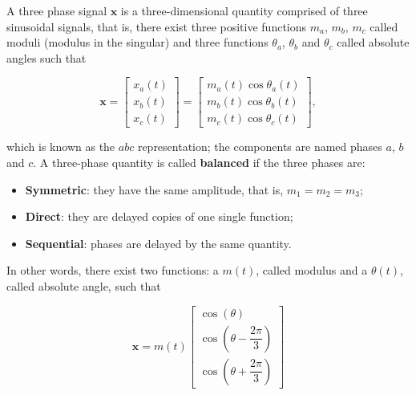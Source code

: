 \begin{definition}\label{def:three_phase_signal} %
	A three phase signal $\mathbf{x}$ is a three-dimensional quantity comprised of three sinusoidal signals, that is, there exist three positive functions $m_a$, $m_b$, $m_c$ called moduli (modulus in the singular) and three functions $\theta_a$, $\theta_b$ and $\theta_c$ called absolute angles such that

\begin{equation} \mathbf{x} = \left[\begin{array}{c} x_a\left(t\right)\\ x_b\left(t\right) \\ x_c\left(t\right) \end{array}\right] = \left[\begin{array}{c} m_a\left(t\right)\cos\theta_a(t)\\ m_b\left(t\right)\cos\theta_b(t) \\ m_c\left(t\right)\cos\theta_c(t) \end{array}\right], \end{equation}

	which is known as the $abc$ representation; the components are named phases $a$, $b$ and $c$. A three-phase quantity is called \textbf{balanced} if the three phases are:

\begin{itemize}
	\item \textbf{Symmetric}: they have the same amplitude, that is, $m_1 = m_2 = m_3$;
	\item \textbf{Direct}: they are delayed copies of one single function;
	\item \textbf{Sequential}: phases are delayed by the same quantity.
\end{itemize}

	In other words, there exist two functions: a $m\left(t\right)$, called modulus and a $\theta\left(t\right)$, called absolute angle, such that

\begin{equation} \mathbf{x} = m(t)\left[
	\begin{array}{c}
		\cos\left(\theta\right) \\[5mm]
		\cos\left(\theta - \dfrac{2\pi}{3}\right) \\[5mm]
		\cos\left(\theta + \dfrac{2\pi}{3}\right)
	\end{array}\right] \label{eq:balanced_threephase_def}
\end{equation}
	
\end{definition} %

